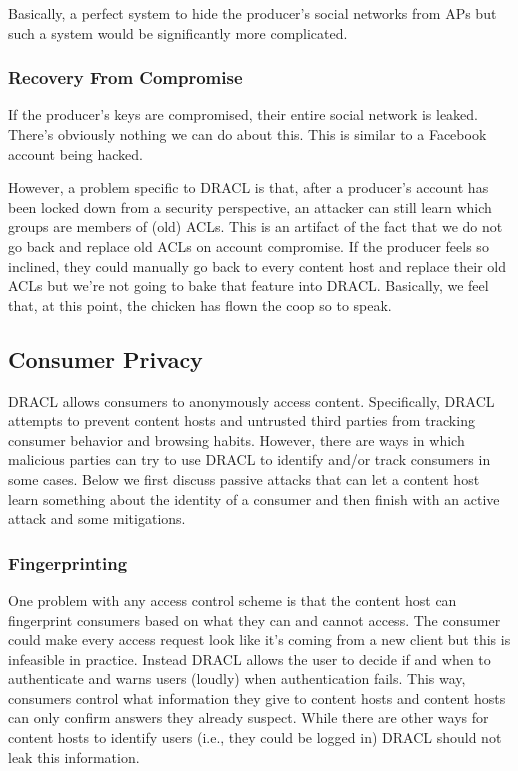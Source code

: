 \documentclass[pdftex,12pt,a4papaer,twoside,notitlepage]{report}
\begin{document}
Basically, a perfect system to hide the producer's social networks from APs but
such a system would be significantly more complicated.

\subsubsection{Recovery From Compromise}

If the producer's keys are compromised, their entire social network is leaked.
There's obviously nothing we can do about this. This is similar to a Facebook
account being hacked.

However, a problem specific to DRACL is that, after a producer's account has
been locked down from a security perspective, an attacker can still learn which
groups are members of (old) ACLs. This is an artifact of the fact that we do not
go back and replace old ACLs on account compromise. If the producer feels so
inclined, they could manually go back to every content host and replace their
old ACLs but we're not going to bake that feature into DRACL. Basically, we feel
that, at this point, the chicken has flown the coop so to speak.

\subsection{Consumer Privacy}
\label{sec:consumer_privacy}

DRACL allows consumers to anonymously access content. Specifically, DRACL
attempts to prevent content hosts and untrusted third parties from tracking
consumer behavior and browsing habits. However, there are ways in which
malicious parties can try to use DRACL to identify and/or track consumers in
some cases. Below we first discuss passive attacks that can let a content host
learn something about the identity of a consumer and then finish with an active
attack and some mitigations.

\subsubsection{Fingerprinting}
\label{sec:fingerprinting}

One problem with any access control scheme is that the content host can
fingerprint consumers based on what they can and cannot access. The consumer
could make every access request look like it's coming from a new client but this
is infeasible in practice. Instead DRACL allows the user to decide if and when
to authenticate and warns users (loudly) when authentication fails. This way,
consumers control what information they give to content hosts and content hosts
can only confirm answers they already suspect. While there are other ways for
content hosts to identify users (i.e., they could be logged in) DRACL should not
leak this information.
\end{document}
